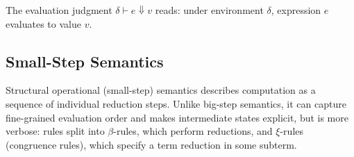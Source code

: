 The evaluation judgment $\delta \vdash e \Downarrow v$ reads: under environment $\delta$, expression $e$ evaluates to value $v$.

\begin{mathpar}







\end{mathpar}

\subsection*{Small-Step Semantics}

Structural operational (small-step) semantics describes computation as a sequence of individual reduction steps.
Unlike big-step semantics, it can capture fine-grained evaluation order and makes intermediate states explicit, but is more verbose: rules split into $\beta$-rules, which perform reductions, and $\xi$-rules (congruence rules), which specify a term reduction in some subterm.

